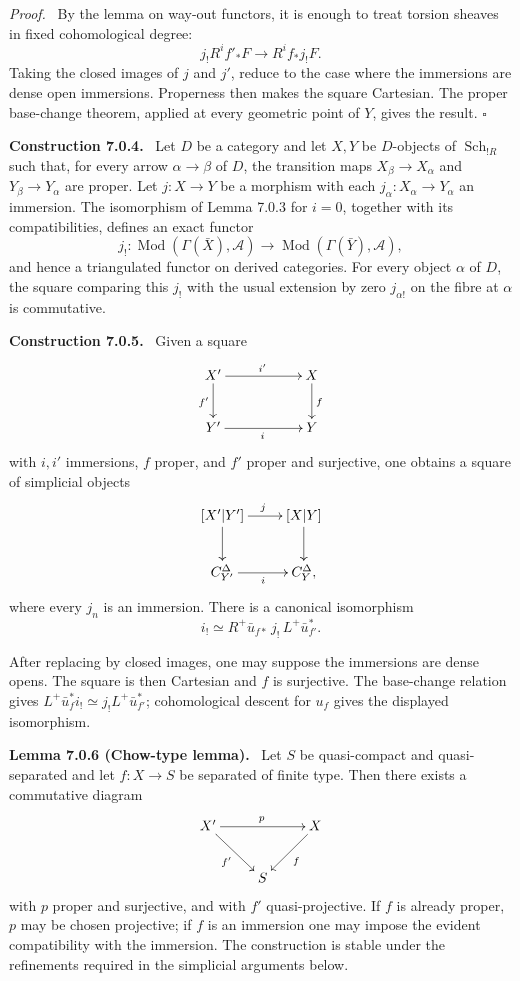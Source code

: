 \documentclass[12pt]{article}
\newcommand{\Aa}{\mathcal A}
\newcommand{\C}{\mathbb C}
\DeclareMathOperator{\Sch}{Sch}
\newcommand{\qedtext}{\hfill\(\square\)}
\newenvironment{statement}[1]{\par\medskip\noindent\textbf{#1.}\ }{\par\medskip}
\newenvironment{prooftext}[1][Proof]{\par\noindent\emph{#1.}\ }{\par\medskip}
\begin{document}
\begin{prooftext}
By the lemma on way-out functors, it is enough to treat torsion sheaves in fixed cohomological degree:
\[
j_!R^if'_*F\longrightarrow R^if_*j_!F.
\]
Taking the closed images of \(j\) and \(j'\), reduce to the case where the immersions are dense open immersions. Properness then makes the square Cartesian. The proper base-change theorem, applied at every geometric point of \(Y\), gives the result. \qedtext
\end{prooftext}

\begin{statement}{Construction 7.0.4}
Let \(D\) be a category and let \(X,Y\) be \(D\)-objects of \(\Sch_{!R}\) such that, for every arrow \(\alpha\to\beta\) of \(D\), the transition maps \(X_\beta\to X_\alpha\) and \(Y_\beta\to Y_\alpha\) are proper. Let \(j:X\to Y\) be a morphism with each \(j_\alpha:X_\alpha\to Y_\alpha\) an immersion. The isomorphism of Lemma 7.0.3 for \(i=0\), together with its compatibilities, defines an exact functor
\[
j_!:\operatorname{Mod}(\Gamma(\bar X),\Aa)\longrightarrow
\operatorname{Mod}(\Gamma(\bar Y),\Aa),
\]
and hence a triangulated functor on derived categories. For every object \(\alpha\) of \(D\), the square comparing this \(j_!\) with the usual extension by zero \(j_{\alpha!}\) on the fibre at \(\alpha\) is commutative.
\end{statement}

\begin{statement}{Construction 7.0.5}
Given a square
\[
\xymatrix{X'\ar[rr]^{i'}\ar[d]_{f'}&&X\ar[d]^f\\Y'\ar[rr]_i&&Y}
\]
with \(i,i'\) immersions, \(f\) proper, and \(f'\) proper and surjective, one obtains a square of simplicial objects
\[
\xymatrix{[X'|Y']\ar[d]\ar[r]^j&[X|Y]\ar[d]\\C^\Delta_{Y'}\ar[r]_i&C^\Delta_Y,}
\]
where every \(j_n\) is an immersion. There is a canonical isomorphism
\[
i_!\simeq R^+\bar u_{f*}\,j_!\,L^+\bar u_{f'}^*.
\]
\end{statement}

After replacing by closed images, one may suppose the immersions are dense opens. The square is then Cartesian and \(f\) is surjective. The base-change relation gives \(L^+\bar u_f^*i_!\simeq j_!L^+\bar u_{f'}^*\); cohomological descent for \(u_f\) gives the displayed isomorphism.

\begin{statement}{Lemma 7.0.6 (Chow-type lemma)}
Let \(S\) be quasi-compact and quasi-separated and let \(f:X\to S\) be separated of finite type. Then there exists a commutative diagram
\[
\xymatrix{X'\ar[rr]^p\ar[rd]_{f'}&&X\ar[ld]^f\\&S&}
\]
with \(p\) proper and surjective, and with \(f'\) quasi-projective. If \(f\) is already proper, \(p\) may be chosen projective; if \(f\) is an immersion one may impose the evident compatibility with the immersion. The construction is stable under the refinements required in the simplicial arguments below.
\end{statement}
\end{document}
